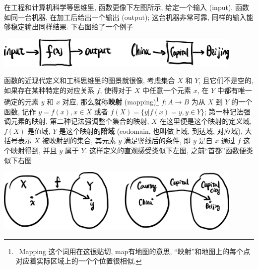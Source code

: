 \begin{tcolorbox}[size=fbox, breakable, enhanced jigsaw, title={函数 (function)}]
\begin{tcolorbox}[size=fbox, breakable, enhanced jigsaw]
\end{tcolorbox}

在工程和计算机科学等思维里, 函数更像下左图所示, 给定一个输入 (input),
函数如同一台机器, 在加工后给出一个输出 (output); 这台机器非常可靠,
同样的输入能够稳定输出同样结果. 下右图给了一个例子

\begin{tcolorbox}[size=fbox, breakable, enhanced jigsaw]
\includegraphics[width=0.9\textwidth]{img/image-20230228095405809.png}

\end{tcolorbox}

函数的近现代定义和工科思维里的图景就很像, 考虑集合 $X$ 和 $Y$,
且它们不是空的, 如果存在某种特定的对应关系 $f$, 使得对于 $X$
中任意一个元素 $x$, 在 $Y$ 中都有唯一确定的元素 $y$ 和 $x$ 对应,
那么就称\textbf{映射} (mapping)\footnote{~Mapping 这个词用在这很贴切,
  map有地图的意思,
  ``映射''和地图上的每个点对应着实际区域上的一个个位置很相似.}
$f: A\rightarrow B$ 为从 $X$ 到 $Y$ 的一个函数, 记作
$y=f(x), x\in X$ 或者 $f(X)=\{y|f(x)=y, y\in Y\}$;
第一种记法强调元素的映射, 第二种记法强调整个集合的映射, $X$
在这里便是这个映射的定义域, $f(X)$ 是值域, $Y$
是这个映射的\textbf{陪域} (codomain, 也叫做上域, 到达域, 对应域),
大括号表示 $X$ 被映射到的集合, 其元素 $y$ 满足竖线后的条件, 即 $y$
是自 $x$ 通过 $f$ 这个映射得到, 并且 $y$ 属于 $Y$.
这样定义的直观感受类似下左图, 之前``首都''函数便类似下右图

\begin{tcolorbox}[size=fbox, breakable, enhanced jigsaw]
\includegraphics[width=0.9\textwidth]{img/image-20230228112941902.png}


\end{tcolorbox}
\end{tcolorbox}
